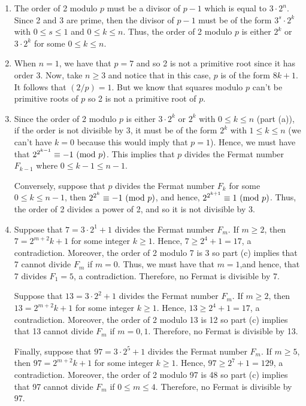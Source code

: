 \begin{solution}
    \begin{enumerate}
        \item The order of 2 modulo $p$ must be a divisor of $p-1$ which is equal to $3\cdot 2^n$. Since 2 and 3 are prime, then the divisor of $p-1$ must be of the form $3^s\cdot 2^k$ with $0\leq s \leq 1$ and $0 \leq k \leq n$. Thus, the order of 2 modulo $p$ is either $2^k$ or $3\cdot 2^k$ for some $0 \leq k \leq n$.
        \item When $n = 1$, we have that $p = 7$ and so 2 is not a primitive root since it has order 3. Now, take $n \geq 3$ and notice that in this case, $p$ is of the form $8k + 1$. It follows that $(2/p) = 1$. But we know that squares modulo $p$ can't be primitive roots of $p$ so 2 is not a primitive root of $p$.
        \item Since the order of 2 modulo $p$ is either $3\cdot 2^k$ or $2^k$ with $0 \leq k \leq n$ (part (a)), if the order is not divisible by 3, it must be of the form $2^k$ with $1 \leq k \leq n$ (we can't have $k = 0$ because this would imply that $p = 1$). Hence, we must have that $2^{2^{k-1}} \equiv -1 \ (\mathrm{mod}\ p)$. This implies that $p$ divides the Fermat number $F_{k-1}$ where $0 \leq k-1 \leq n-1$.
        
        Conversely, suppose that $p$ divides the Fermat number $F_k$ for some $0 \leq k \leq n-1$, then $2^{2^{k}} \equiv -1 \ (\mathrm{mod}\ p)$, and hence, $2^{2^{k+1}} \equiv 1 \ (\mathrm{mod}\ p)$. Thus, the order of 2 divides a power of 2, and so it is not divisible by 3.
        \item Suppose that $7 = 3\cdot 2^1 + 1$ divides the Fermat number $F_m$. If $m \geq 2$, then $7 = 2^{m+2}k + 1$ for some integer $k \geq 1$. Hence, $7 \geq 2^4 + 1 = 17$, a contradiction. Moreover, the order of 2 modulo 7 is 3 so part (c) implies that 7 cannot divide $F_m$ if $m = 0$. Thus, we must have that $m = 1$,and hence, that 7 divides $F_1 = 5$, a contradiction. Therefore, no Fermat is divisible by 7.
        
        Suppose that $13 = 3\cdot 2^2 + 1$ divides the Fermat number $F_m$. If $m \geq 2$, then $13 = 2^{m+2}k + 1$ for some integer $k \geq 1$. Hence, $13 \geq 2^4 + 1 = 17$, a contradiction. Moreover, the order of 2 modulo 13 is 12 so part (c) implies that 13 cannot divide $F_m$ if $m = 0,1$. Therefore, no Fermat is divisible by 13.

        Finally, suppose that $97 = 3\cdot 2^5 + 1$ divides the Fermat number $F_m$. If $m \geq 5$, then $97 = 2^{m+2}k + 1$ for some integer $k \geq 1$. Hence, $97 \geq 2^7 + 1 = 129$, a contradiction. Moreover, the order of 2 modulo 97 is 48 so part (c) implies that 97 cannot divide $F_m$ if $0 \leq m \leq 4$. Therefore, no Fermat is divisible by 97. \\
    \end{enumerate}
\end{solution}

